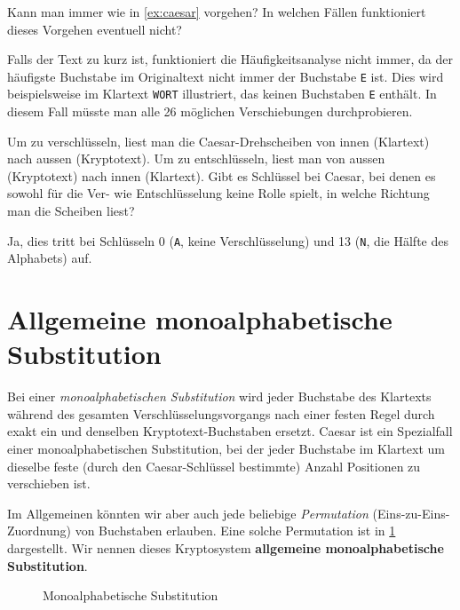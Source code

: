 \begin{myexercise}
	Kann man immer wie in \cref{ex:caesar} vorgehen? In welchen Fällen funktioniert dieses Vorgehen eventuell nicht?
	\begin{myanswer}
		Falls der Text zu kurz ist, funktioniert die Häufigkeitsanalyse nicht immer, da der häufigste Buchstabe im Originaltext nicht immer der Buchstabe \texttt{E} ist. Dies wird beispielsweise im Klartext \texttt{WORT} illustriert, das keinen Buchstaben \texttt{E} enthält. In diesem Fall müsste man alle 26 möglichen Verschiebungen durchprobieren.
	\end{myanswer}
\end{myexercise}

\begin{mychallenge}
	Um zu verschlüsseln, liest man die Caesar-Drehscheiben von innen (Klartext) nach aussen (Kryptotext). Um zu entschlüsseln, liest man von aussen (Kryptotext) nach innen (Klartext). Gibt es Schlüssel bei Caesar, bei denen es sowohl für die Ver- wie Entschlüsselung keine Rolle spielt, in welche Richtung man die Scheiben liest?
	\begin{myanswer}
		Ja, dies tritt bei Schlüsseln 0 (\texttt{A}, keine Verschlüsselung) und 13 (\texttt{N}, die Hälfte des Alphabets) auf.
	\end{myanswer}
\end{mychallenge}


\section{Allgemeine monoalphabetische Substitution}
Bei einer \emph{monoalphabetischen Substitution} wird jeder Buchstabe des Klartexts während des gesamten Verschlüsselungsvorgangs nach einer festen Regel durch exakt ein und denselben Kryptotext-Buchstaben ersetzt.
Caesar ist ein Spezialfall einer monoalphabetischen Substitution, bei der jeder Buchstabe im Klartext um dieselbe feste (durch den Caesar-Schlüssel bestimmte) Anzahl Positionen zu verschieben ist.

Im Allgemeinen könnten wir aber auch jede beliebige \emph{Permutation} (Eins-zu-Eins-Zuordnung) von Buchstaben erlauben. Eine solche Permutation ist in \cref{fig:monoalph-subst} dargestellt. Wir nennen dieses Kryptosystem \textbf{allgemeine monoalphabetische Substitution}.
\begin{figure}[H]
	\centering
	\caption{Monoalphabetische Substitution}
	\label{fig:monoalph-subst}
\end{figure}

